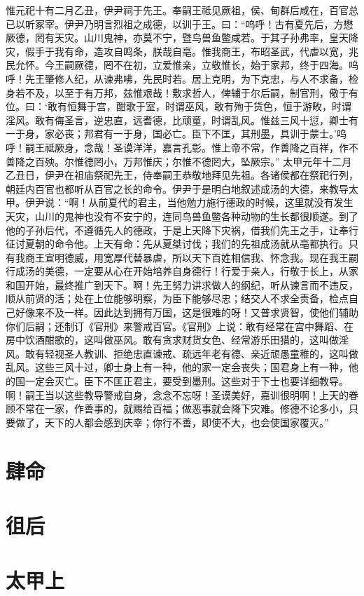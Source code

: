 \documentclass[12pt,UTF8]{ctexbook}
\begin{document}
惟元祀十有二月乙丑，伊尹祠于先王。奉嗣王祗见厥祖，侯、甸群后咸在，百官总已以听冢宰。伊尹乃明言烈祖之成德，以训于王。曰：“呜呼！古有夏先后，方懋厥德，罔有天灾。山川鬼神，亦莫不宁，暨鸟兽鱼鳖咸若。于其子孙弗率，皇天降灾，假手于我有命，造攻自鸣条，朕哉自亳。惟我商王，布昭圣武，代虐以宽，兆民允怀。今王嗣厥德，罔不在初，立爱惟亲，立敬惟长，始于家邦，终于四海。呜呼！先王肇修人纪，从谏弗咈，先民时若。居上克明，为下克忠，与人不求备，检身若不及，以至于有万邦，兹惟艰哉！敷求哲人，俾辅于尔后嗣，制官刑，儆于有位。曰：‘敢有恒舞于宫，酣歌于室，时谓巫风，敢有殉于货色，恒于游畋，时谓淫风。敢有侮圣言，逆忠直，远耆德，比顽童，时谓乱风。惟兹三风十愆，卿士有一于身，家必丧；邦君有一于身，国必亡。臣下不匡，其刑墨，具训于蒙士。’呜呼！嗣王祗厥身，念哉！圣谟洋洋，嘉言孔彰。惟上帝不常，作善降之百祥，作不善降之百殃。尔惟德罔小，万邦惟庆；尔惟不德罔大，坠厥宗。”
太甲元年十二月乙丑日，伊尹在祖庙祭祀先王，侍奉嗣王恭敬地拜见先祖。各诸侯都在祭祀行列，朝廷内百官也都听从百官之长的命令。伊尹于是明白地叙述成汤的大德，来教导太甲。伊尹说：“啊！从前夏代的君主，当他勉力施行德政的时候，这里就没有发生天灾，山川的鬼神也没有不安宁的，连同鸟兽鱼鳖各种动物的生长都很顺遂。到了他的子孙后代，不遵循先人的德政，于是上天降下灾祸，借我们先王之手，让奉行征讨夏朝的命令他。上天有命：先从夏桀讨伐；我们的先祖成汤就从亳都执行。只有我商王宣明德威，用宽厚代替暴虐，所以天下百姓相信我、怀念我。现在我王嗣行成汤的美德，一定要从心在开始培养自身德行！行爱于亲人，行敬于长上，从家和国开始，最终推广到天下。啊！先王努力讲求做人的纲纪，听从谏言而不违反，顺从前贤的活；处在上位能够明察，为臣下能够尽忠；结交人不求全责备，检点自己好像来不及一样。因此达到拥有万国，这是很难的呀！又普求贤智，使他们辅助你们后嗣；还制订《官刑》来警戒百官。《官刑》上说：敢有经常在宫中舞蹈、在房中饮酒酣歌的，这叫做巫风。敢有贪求财货女色、经常游乐田猎的，这叫做淫风。敢有轻视圣人教训、拒绝忠直谏戒、疏远年老有德、亲近顽愚童稚的，这叫做乱风。这些三风十过，卿士身上有一种，他的家一定会丧失；国君身上有一种，他的国一定会灭亡。臣下不匡正君主，要受到墨刑。这些对于下士也要详细教导。啊！嗣王当以这些教导警戒自身，念念不忘呀！圣谟美好，嘉训很明啊！上天的眷顾不常在一家，作善事的，就赐给百福；做恶事就会降下灾难。修德不论多小，只要做了，天下的人都会感到庆幸；你行不善，即使不大，也会使国家覆灭。”
\chapter{肆命}
\chapter{徂后}
\chapter{太甲上}
\end{document}
